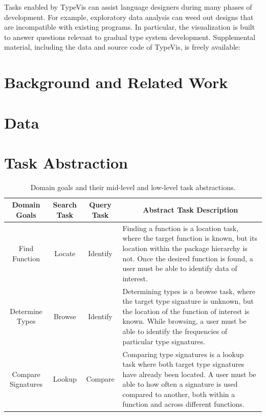 \documentclass{vgtc}                          %
\begin{document}
Tasks enabled by {\sc TypeVis} can assist language designers
during many phases of development.
For example, exploratory data analysis can weed out designs that
are incompatible with existing programs.
In particular, the visualization is built to answer questions
relevant to gradual type system development.
Supplemental material, including the data and source code of
{\sc TypeVis}, is freely available: 


\section{Background and Related Work}



\section{Data}



\section{Task Abstraction}

\bgroup
\def\arraystretch{1.75}
\begin{table}
  \centering
  \begin{tabularx}{\linewidth}{c|c|c|X}
    Domain Goals & Search Task & Query Task & \multicolumn{1}{c}{Abstract Task Description} \\
    \hline
    Find Function & Locate & Identify & Finding a function is a location task, where the target function is known, but its location within the package hierarchy is not. Once the desired function is found, a user must be able to identify data of interest. \\

    Determine Types & Browse & Identify & Determining types is a browse task, where the target type signature is unknown, but the location of the function of interest is known. While browsing, a user must be able to identify the frequencies of particular type signatures.\\

    Compare Signatures & Lookup & Compare & Comparing type signatures is a lookup task where both target type signatures have already been located. A user must be able to how often a signature is used compared to another, both within a function and across different functions.\\
  \end{tabularx}
  \caption{Domain goals and their mid-level and low-level task abstractions.}
  \label{tab:tasks}
\end{table}
\egroup
\end{document}
